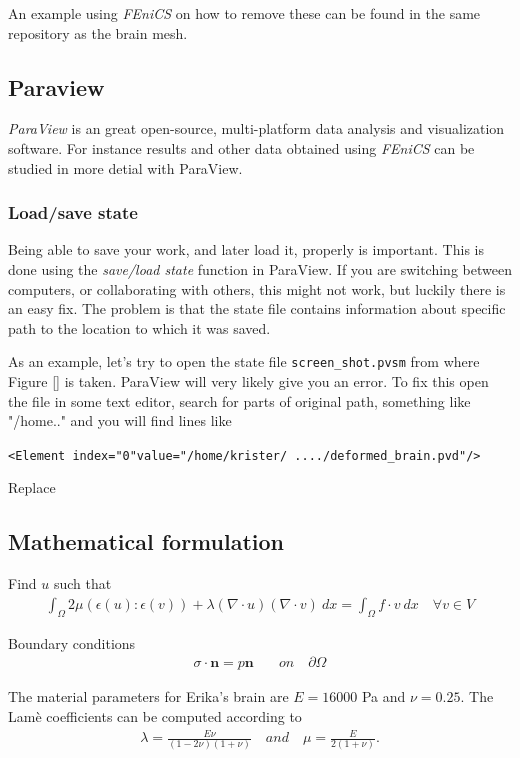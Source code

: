 \documentclass[epsfig,11pt]{article}
\begin{document}
An example using \emph{FEniCS} on how to remove these can be found in the same repository as the brain mesh. 

\subsection{Paraview}
\emph{ParaView} is an great open-source, multi-platform data analysis and visualization software. For instance results and other data obtained using \emph{FEniCS} can be studied in more detial with ParaView.  

\subsubsection{Load/save state}

Being able to save your work, and later load it, properly is important. This is done using the \emph{save/load state} function in ParaView. If you are switching between computers, or collaborating with others, this might not work, but luckily there is an easy fix. The problem is that the state file contains information about specific path to the location to which it was saved. 

As an example, let's try to open the state file  \texttt{screen\_shot.pvsm} from where Figure [] is taken. ParaView will very likely give you an error. To fix this open the file in some text editor, search for parts of original path, something like "/home.." and you will find lines like 

\texttt{<Element index="0"value="/home/krister/ ..../deformed\_brain.pvd"/>}

Replace 


\subsection{Mathematical formulation}

Find $u$ such that 
\begin{align*}
  \int_\Omega  2\mu (\epsilon(u) : \epsilon(v))  +\lambda (\nabla \cdot u) (\nabla \cdot v) \: dx = \int_\Omega f \cdot v \: dx \quad \forall v \in V
\end{align*} 

Boundary conditions
\begin{align*}
\sigma \cdot \mathbf{n} = p\mathbf{n} \quad &on \quad \partial \Omega
\end{align*}

The material parameters for Erika's brain are $E = 16000 $ Pa and $\nu = 0.25$. The Lamè coefficients can be computed according to 
\begin{align*}
\lambda = \frac{E \nu}{(1-2\nu)(1+\nu)} \quad and \quad \mu = \frac{E}{2(1+\nu)}.
\end{align*}
\end{document}
